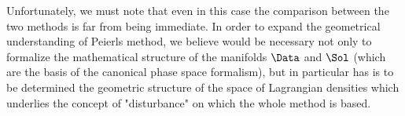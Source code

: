 \documentclass[Main]{subfiles}
\begin{document}
		Unfortunately, we must note that even in this case the comparison between the two methods is far from being immediate.
%
		In order to expand the geometrical understanding of Peierls method, we believe would be necessary not only to formalize the mathematical structure of the manifolds $\Data$ and $\Sol$ (which are the basis of the canonical phase space formalism), 
		but in particular has is to be determined the geometric structure of the space of Lagrangian densities which underlies the concept of "disturbance" on which the whole method is based.
\end{document}
